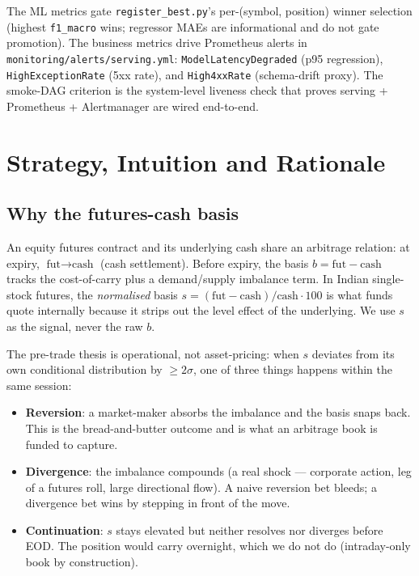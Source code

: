 \documentclass[11pt,a4paper]{article}
\begin{document}
The ML metrics gate \texttt{register\_best.py}'s per-(symbol, position) winner selection (highest \texttt{f1\_macro} wins; regressor MAEs are informational and do not gate promotion). The business metrics drive Prometheus alerts in \texttt{monitoring/alerts/serving.yml}: \texttt{ModelLatencyDegraded} (p95 regression), \texttt{HighExceptionRate} (5xx rate), and \texttt{High4xxRate} (schema-drift proxy). The smoke-DAG criterion is the system-level liveness check that proves serving + Prometheus + Alertmanager are wired end-to-end.

\newpage
\section{Strategy, Intuition and Rationale}

\subsection{Why the futures-cash basis}
An equity futures contract and its underlying cash share an arbitrage relation: at expiry, $\text{fut} \to \text{cash}$ (cash settlement). Before expiry, the basis $b = \text{fut} - \text{cash}$ tracks the cost-of-carry plus a demand/supply imbalance term. In Indian single-stock futures, the \emph{normalised} basis $s = (\text{fut} - \text{cash})/\text{cash} \cdot 100$ is what funds quote internally because it strips out the level effect of the underlying. We use $s$ as the signal, never the raw $b$.

The pre-trade thesis is operational, not asset-pricing: when $s$ deviates from its own conditional distribution by $\geq 2\sigma$, one of three things happens within the same session:
\begin{itemize}[leftmargin=1.5em,itemsep=0pt]
  \item \textbf{Reversion}: a market-maker absorbs the imbalance and the basis snaps back. This is the bread-and-butter outcome and is what an arbitrage book is funded to capture.
  \item \textbf{Divergence}: the imbalance compounds (a real shock --- corporate action, leg of a futures roll, large directional flow). A naive reversion bet bleeds; a divergence bet wins by stepping in front of the move.
  \item \textbf{Continuation}: $s$ stays elevated but neither resolves nor diverges before EOD. The position would carry overnight, which we do not do (intraday-only book by construction).
\end{itemize}
\end{document}
